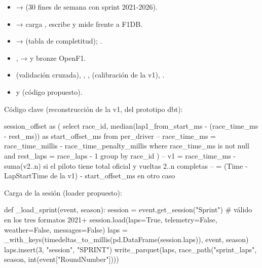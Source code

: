 \begin{itemize}
\item {} →  (30 fines de semana con sprint 2021-2026).
\item {} → carga , escribe  y mide frente a F1DB.
\item {} →  (tabla de completitud); .
\item {},  →  y bronze OpenF1.
\item {} (validación cruzada), , ,  (calibración de la v1), .
\item {} y  (código propuesto).
\end{itemize}

Código clave (reconstrucción de la v1, del prototipo dbt):

\begin{codigo}
session_offset as (
    select race_id, median(lap1_from_start_ms - (race_time_ms - rest_ms)) as start_offset_ms
    from per_driver                 -- race_time_ms = race_time_millis - race_time_penalty_millis
    where race_time_ms is not null and rest_laps = race_laps - 1
    group by race_id
)
-- v1 = race_time_ms - suma(v2..n)   si el piloto tiene total oficial y vueltas 2..n completas
--    = (Time - LapStartTime de la v1) - start_offset_ms   en otro caso
\end{codigo}

Carga de la sesión (loader propuesto):

\begin{codigo}
def _load_sprint(event, season):
    session = event.get_session("Sprint")  # válido en los tres formatos 2021+
    session.load(laps=True, telemetry=False, weather=False, messages=False)
    laps = _with_keys(timedeltas_to_millis(pd.DataFrame(session.laps)), event, season)
    laps.insert(3, "session", "SPRINT")
    write_parquet(laps, race_path("sprint_laps", season, int(event["RoundNumber"])))
\end{codigo}

